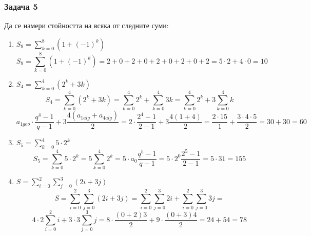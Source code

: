 \documentclass[fleqn, 12pt]{article}
\theoremstyle{definition}
\begin{document}
\subsubsection*{Задача 5}
Да се намери стойността на всяка от следните суми:
\begin{enumerate}
\item $S_9 = \sum_{k=0}^8 (1 + (-1)^k)$
$$S_9 = \sum_{k=0}^8 (1 + (-1)^k) = 2 + 0 + 2 + 0 + 2 + 0 + 2 + 0 + 2 = 5 \cdot 2 + 4 \cdot 0 = 10$$
\item $S_4 = \sum_{k=0}^4 (2^k + 3k)$
$$S_4 = \sum_{k=0}^4 (2^k + 3k) = \sum_{k=0}^4 2^k + \sum_{k=0}^4 3k = \sum_{k=0}^4 2^k + 3\sum_{k=0}^4 k$$
$$a_{1geo} \cdot \frac{q^4 - 1}{q -1} + 3 \frac{4(a_{1alg} + a_{4alg})}{2} = 2 \cdot \frac{2^4 - 1}{2 -1} + 3 \frac{4(1 +4)}{2} =  \frac{2 \cdot 15}{1} + \frac{3 \cdot 4 \cdot 5}{2} = 30 + 30 = 60$$
\item $S_5 = \sum_{k=0}^4 5 \cdot 2^k$
$$S_5 = \sum_{k=0}^4 5 \cdot 2^k = 5 \sum_{k=0}^4 2^k = 5 \cdot a_0  \frac{q^5 - 1}{q -1} = 5 \cdot 2^0 \frac{2^5 - 1}{2 -1} = 5 \cdot 31 = 155$$
\item $S = \sum_{i=0}^2 \sum_{j=0}^3 (2i + 3j)$
$$S = \sum_{i=0}^2 \sum_{j=0}^3 (2i + 3j) = \sum_{i=0}^2 \sum_{j=0}^3 2i + \sum_{i=0}^2 \sum_{j=0}^3 3j = $$ $$4 \cdot 2 \sum_{i=0}^2 i + 3 \cdot 3 \sum_{j=0}^3 j = 8 \cdot \frac{(0+2)3}{2} + 9 \cdot \frac{(0+3)4}{2} = 24 + 54 = 78$$
\end{enumerate}

\newpage
\end{document}
